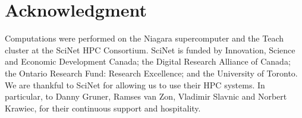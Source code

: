 \section*{Acknowledgment}

Computations were performed on the Niagara supercomputer and the Teach cluster at the SciNet HPC Consortium. SciNet is funded by Innovation, Science and Economic Development Canada; the Digital Research Alliance of Canada; the Ontario Research Fund: Research Excellence; and the University of Toronto.
We are thankful to SciNet for allowing us to use their HPC systems.
In particular, to Danny Gruner, Ramses van Zon, Vladimir Slavnic and
Norbert Krawiec, for their continuous support and hospitality.
